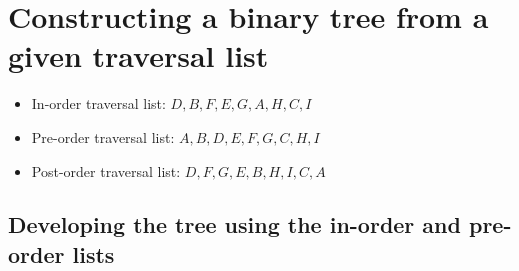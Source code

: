 \section{Constructing a binary tree from a given traversal list}
\begin{itemize}
    \item In-order traversal list: $D,B,F,E,G,A,H,C,I$
    \item Pre-order traversal list: $A,B,D,E,F,G,C,H,I$
    \item Post-order traversal list: $D,F,G,E,B,H,I,C,A$
\end{itemize}

\subsection{Developing the tree using the in-order and pre-order lists}

